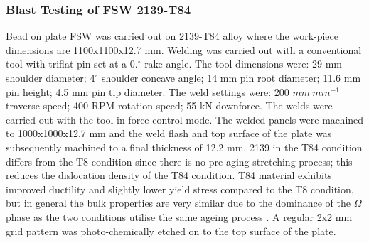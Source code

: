 \subsubsection{Blast Testing of FSW 2139-T84}
\label{EMBlastTesting}
Bead on plate FSW was carried out on 2139-T84 alloy where the work-piece dimensions are 1100x1100x12.7 mm. Welding was carried out with a conventional tool with triflat pin set at a 0.$^\circ$ rake angle. The tool dimensions were: 29 mm shoulder diameter; 4$^\circ$ shoulder concave angle; 14 mm pin root diameter; 11.6 mm pin height; 4.5 mm pin tip diameter. The weld settings were: 200 $mm\:min^{-1}$ traverse speed; 400 RPM rotation speed; 55 kN downforce. The welds were carried out with the tool in force control mode. The welded panels were machined to 1000x1000x12.7 mm and the weld flash and top surface of the plate was subsequently machined to a final thickness of 12.2 mm. 2139 in the T84 condition differs from the T8 condition since there is no pre-aging stretching process; this reduces the dislocation density of the T84 condition. T84 material exhibits improved ductility and slightly lower yield stress compared to the T8 condition, but in general the bulk properties are very similar due to the dominance of the $\Omega$ phase as the two conditions utilise the same ageing process \cite{Franklin2014}. A regular 2x2 mm grid pattern was photo-chemically etched on to the top surface of the plate.

